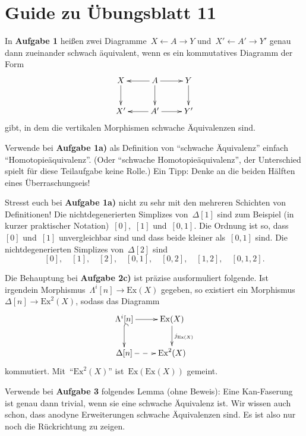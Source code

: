 \documentclass{uebblatt}
\begin{document}
\section*{Guide zu Übungsblatt 11}

In \textbf{Aufgabe 1} heißen zwei Diagramme~$X \leftarrow A \rightarrow Y$
und~$X' \leftarrow A' \rightarrow Y'$ genau dann zueinander schwach äquivalent,
wenn es ein kommutatives Diagramm der Form
\[ \xymatrix{
  X \ar[d] & A \ar[l]\ar[r] \ar[d] & Y \ar[d] \\
  X' & A' \ar[l]\ar[r] & Y'
} \]
gibt, in dem die vertikalen Morphismen schwache Äquivalenzen sind.

Verwende bei \textbf{Aufgabe 1a)} als Definition von "`schwache Äquivalenz"'
einfach "`Homotopieäquivalenz"'. (Oder "`schwache Homotopieäquivalenz"', der
Unterschied spielt für diese Teilaufgabe keine Rolle.) Ein Tipp: Denke an die
beiden Hälften eines Überraschungseis!

Stresst euch bei \textbf{Aufgabe 1a)} nicht zu sehr mit den mehreren Schichten
von Definitionen! Die nichtdegenerierten Simplizes von~$\Delta[1]$ sind zum
Beispiel (in kurzer praktischer Notation)~$[0]$,~$[1]$ und~$[0,1]$. Die Ordnung ist
so, dass~$[0]$ und~$[1]$ unvergleichbar sind und dass beide kleiner als~$[0,1]$
sind. Die nichtdegenerierten Simplizes von~$\Delta[2]$ sind
\[
  [0], \quad
  [1], \quad
  [2], \quad
  [0,1], \quad
  [0,2], \quad
  [1,2], \quad
  [0,1,2].
\]

Die Behauptung bei \textbf{Aufgabe 2c)} ist präzise ausformuliert folgende. Ist
irgendein Morphismus~$\Lambda^i[n] \to \mathrm{Ex}(X)$ gegeben, so existiert
ein Morphismus~$\Delta[n] \to \mathrm{Ex}^2(X)$, sodass das Diagramm
\[ \xymatrix{
  \Lambda^i[n] \ar[r] \ar@{^{(}->}[d] & \mathrm{Ex}(X) \ar[d]^{j_{\mathrm{Ex}(X)}} \\
  \Delta[n] \ar@{-->}[r] & \mathrm{Ex}^2(X)
} \]
kommutiert. Mit~"`$\mathrm{Ex}^2(X)$"' ist~$\mathrm{Ex}(\mathrm{Ex}(X))$ gemeint.

Verwende bei \textbf{Aufgabe 3} folgendes Lemma (ohne Beweis): Eine
Kan-Faserung ist genau dann trivial, wenn sie eine schwache Äquivalenz ist.
Wir wissen auch schon, dass anodyne Erweiterungen schwache Äquivalenzen sind.
Es ist also nur noch die Rückrichtung zu zeigen.
\end{document}
